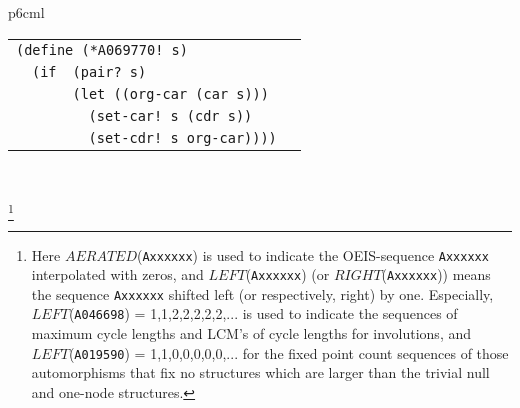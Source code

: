\documentclass[11pt]{article} %
\newcommand{\catint}[1]{({\it #1})}
\newcommand{\EISseq}[1]{{\tt #1}}
\newcommand{\scmcode}[1]{{\tt{#1}}}
\newenvironment{scmdefinefun5}{\begin{tabular}{l l l l p{5cm}}}{\end{tabular}}
\begin{document}
\begin{tabular}{p{6cm}l}
\begin{scmdefinefun5}

\multicolumn{4}{l}{\scmcode{(define (*A069770! s)}}\\
 & \scmcode{(if} & \multicolumn{2}{l}{\scmcode{(pair? s)}} \\
 &               & \multicolumn{2}{l}{\scmcode{(let ((org-car (car s)))}} \\

 & &  & \scmcode{(set-car! s (cdr s))} \\
 & &  & \scmcode{(set-cdr! s org-car))))} \\
\end{scmdefinefun5}
\\


\end{tabular}
\footnote{
Here $AERATED$(\EISseq{Axxxxxx}) is used to
indicate the OEIS-sequence
\EISseq{Axxxxxx} interpolated with zeros,
and $LEFT$(\EISseq{Axxxxxx}) (or $RIGHT$(\EISseq{Axxxxxx}))
means the sequence 
\EISseq{Axxxxxx} shifted left (or respectively, right) by one.
Especially, $LEFT$(\EISseq{A046698}) = 1,1,2,2,2,2,2,...
is used to indicate the sequences of maximum cycle lengths and
LCM's of cycle lengths for involutions, and
$LEFT$(\EISseq{A019590}) = 1,1,0,0,0,0,0,...
for the fixed point count sequences
of those automorphisms that fix no structures
which are larger than the trivial null and one-node structures.}
\end{document}
